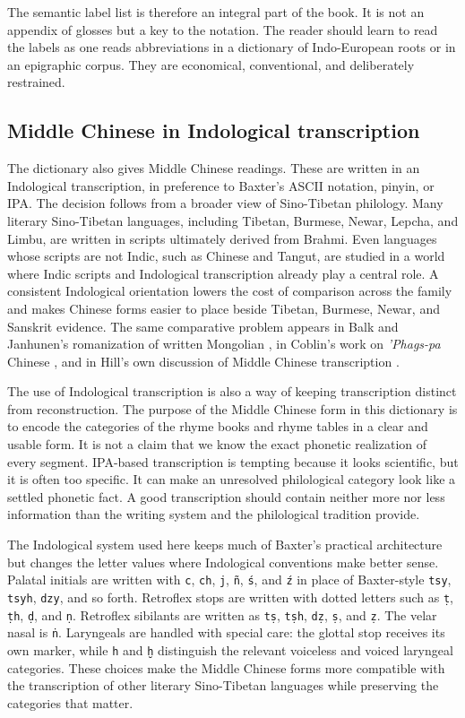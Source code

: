 The semantic label list is therefore an integral part of the book. It is not an appendix of glosses but a key to the notation. The reader should learn to read the labels as one reads abbreviations in a dictionary of Indo-European roots or in an epigraphic corpus. They are economical, conventional, and deliberately restrained.

\subsection*{Middle Chinese in Indological transcription}

The dictionary also gives Middle Chinese readings. These are written in an Indological transcription, in preference to Baxter's ASCII notation, pinyin, or IPA. The decision follows from a broader view of Sino-Tibetan philology. Many literary Sino-Tibetan languages, including Tibetan, Burmese, Newar, Lepcha, and Limbu, are written in scripts ultimately derived from Brahmi. Even languages whose scripts are not Indic, such as Chinese and Tangut, are studied in a world where Indic scripts and Indological transcription already play a central role. A consistent Indological orientation lowers the cost of comparison across the family and makes Chinese forms easier to place beside Tibetan, Burmese, Newar, and Sanskrit evidence. The same comparative problem appears in Balk and Janhunen's romanization of written Mongolian \parencite{balk-janhunen-1999}, in Coblin's work on \emph{'Phags-pa} Chinese \parencite{coblin-2001,coblin-2007}, and in Hill's own discussion of Middle Chinese transcription \parencite{hill-2023-indological}.

The use of Indological transcription is also a way of keeping transcription distinct from reconstruction. The purpose of the Middle Chinese form in this dictionary is to encode the categories of the rhyme books and rhyme tables in a clear and usable form. It is not a claim that we know the exact phonetic realization of every segment. IPA-based transcription is tempting because it looks scientific, but it is often too specific. It can make an unresolved philological category look like a settled phonetic fact. A good transcription should contain neither more nor less information than the writing system and the philological tradition provide.

The Indological system used here keeps much of Baxter's practical architecture but changes the letter values where Indological conventions make better sense. Palatal initials are written with \texttt{c}, \texttt{ch}, \texttt{j}, \texttt{ñ}, \texttt{ś}, and \texttt{ź} in place of Baxter-style \texttt{tsy}, \texttt{tsyh}, \texttt{dzy}, and so forth. Retroflex stops are written with dotted letters such as \texttt{ṭ}, \texttt{ṭh}, \texttt{ḍ}, and \texttt{ṇ}. Retroflex sibilants are written as \texttt{tṣ}, \texttt{tṣh}, \texttt{dẓ}, \texttt{ṣ}, and \texttt{ẓ}. The velar nasal is \texttt{ṅ}. Laryngeals are handled with special care: the glottal stop receives its own marker, while \texttt{h} and \texttt{ḫ} distinguish the relevant voiceless and voiced laryngeal categories. These choices make the Middle Chinese forms more compatible with the transcription of other literary Sino-Tibetan languages while preserving the categories that matter.

